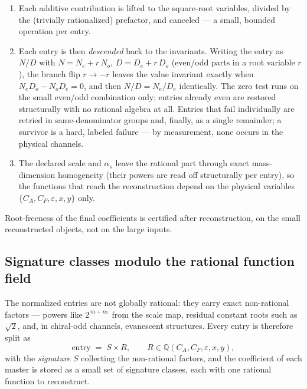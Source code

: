 \documentclass[11pt]{article}
\newcommand{\eps}{\varepsilon}
\newcommand{\CA}{C_A}
\newcommand{\CF}{C_F}
\newcommand{\as}{\alpha_s}
\begin{document}
\begin{enumerate}
\item Each additive contribution is lifted to the square-root
  variables, divided by the (trivially rationalized) prefactor, and
  canceled --- a small, bounded operation per entry.
\item Each entry is then \emph{descended} back to the invariants.
  Writing the entry as $N/D$ with
  $N = N_e + r\,N_o$, $D = D_e + r\,D_o$ (even/odd parts in a root
  variable $r$), the branch flip $r \to -r$ leaves the value invariant
  exactly when $N_e D_o - N_o D_e = 0$, and then
  $N/D = N_e/D_e$ identically.  The zero test runs on the small
  even/odd combination only; entries already even are restored
  structurally with no rational algebra at all.  Entries that fail
  individually are retried in same-denominator groups and, finally,
  as a single remainder; a survivor is a hard, labeled failure ---
  by measurement, none occurs in the physical channels.
\item The declared scale and $\as$ leave the rational part through
  exact mass-dimension homogeneity (their powers are read off
  structurally per entry), so the functions that reach the
  reconstruction depend on the physical variables
  $\{\CA, \CF, \eps, x, y\}$ only.
\end{enumerate}

Root-freeness of the final coefficients is certified after
reconstruction, on the small reconstructed objects, not on the large
inputs.

\subsection{Signature classes modulo the rational function field}
\label{sec:signatures}

The normalized entries are not globally rational: they carry exact
non-rational factors --- powers like $2^{\,m+n\eps}$ from the scale
map, residual constant roots such as $\sqrt2$, and, in chiral-odd
channels, evanescent structures.  Every entry is therefore split as
\begin{equation}
  \text{entry} \;=\; S \times R,
  \qquad
  R \in \mathbb{Q}(\CA,\CF,\eps,x,y),
\end{equation}
with the \emph{signature} $S$ collecting the non-rational factors, and
the coefficient of each master is stored as a small set of signature
classes, each with one rational function to reconstruct.
\end{document}
